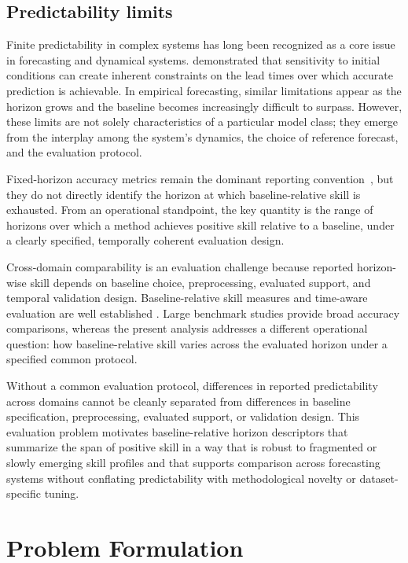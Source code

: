 \documentclass[pdflatex]{sn-jnl}
\begin{document}
\subsection{Predictability limits}

Finite predictability in complex systems has long been recognized as a
core issue in forecasting and dynamical systems. \citet{lorenz1969}
demonstrated that sensitivity to initial conditions can create inherent
constraints on the lead times over which accurate prediction is
achievable. In empirical forecasting, similar limitations appear as the
horizon grows and the baseline becomes increasingly difficult to surpass.
However, these limits are not solely characteristics of a particular
model class; they emerge from the interplay among the system's dynamics,
the choice of reference forecast, and the evaluation protocol.

Fixed-horizon accuracy metrics remain the dominant reporting convention~\citep{makridakis2020,godahewa2021},
but they do not directly identify the horizon at which baseline-relative
skill is exhausted. From an operational standpoint, the key quantity is
the range of horizons over which a method achieves positive skill
relative to a baseline, under a clearly specified, temporally coherent
evaluation design.

Cross-domain comparability is an evaluation challenge because reported
horizon-wise skill depends on baseline choice, preprocessing, evaluated
support, and temporal validation design. Baseline-relative skill measures
and time-aware evaluation are well established
\citep{hyndman2006, murphy1993, tashman2000}. Large benchmark studies
\citep{makridakis2020, godahewa2021} provide broad accuracy comparisons,
whereas the present analysis addresses a different operational question:
how baseline-relative skill varies across the evaluated horizon under a
specified common protocol.

Without a common evaluation protocol, differences in reported
predictability across domains cannot be cleanly separated from differences
in baseline specification, preprocessing, evaluated support, or validation
design. This evaluation problem motivates baseline-relative horizon descriptors
that summarize the span of positive skill in a way that is robust to
fragmented or slowly emerging skill profiles and that supports comparison
across forecasting systems without conflating predictability with
methodological novelty or dataset-specific tuning.

\section{Problem Formulation}
\end{document}
